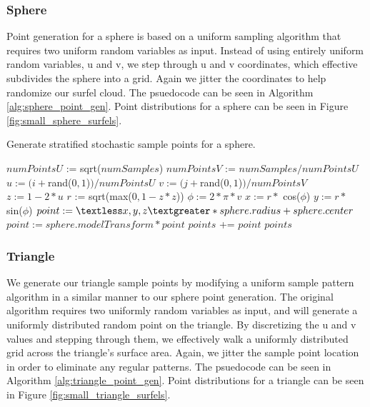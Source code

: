 \subsubsection{Sphere}
\label{sec:sphere_point_gen}
Point generation for a sphere is based on a uniform sampling algorithm \cite{bib:pbr} that requires two uniform random variables as input. Instead of using entirely uniform random variables, u and v, we step through u and v coordinates, which effective subdivides the sphere into a grid. Again we jitter the coordinates to help randomize our surfel cloud.
The psuedocode can be seen in Algorithm \ref{alg:sphere_point_gen}.
Point distributions for a sphere can be seen in Figure \ref{fig:small_sphere_surfels}.

\begin{algorithm}[H]
\captionfont
\caption[Sphere point generation]{Generate stratified stochastic sample points for a sphere.}
\label{alg:sphere_point_gen}
{\fontsize{10}{9}\selectfont
\begin{algorithmic}
      \State $numPointsU$ := sqrt($numSamples$)
      \State $numPointsV$ := $numSamples / numPointsU$
            \State $u := (i + $rand($0,1$)$) / numPointsU$
            \State $v := (j + $rand($0,1$)$) / numPointsV$
            \State $z := 1 - 2*u$
            \State $r$ := sqrt(max($0, 1- z*z$))
            \State $\phi := 2 * \pi * v$
            \State $x := r *$ cos($\phi$)
            \State $y := r *$ sin($\phi$)
            \State $point := \textless x, y, z \textgreater * sphere.radius + sphere.center$
            \State $point := sphere.modelTransform * point$
            \State $points$ += $point$
         \EndFor
      \EndFor
      \State \Return $points$
   \EndFunction
\end{algorithmic}
}
\end{algorithm}

\subsubsection{Triangle}
\label{sec:triangle_point_gen}
We generate our triangle sample points by modifying a uniform sample pattern algorithm \cite{bib:pbr} in a similar manner to our sphere point generation.
The original algorithm requires two uniformly random variables as input, and will generate a uniformly distributed random point on the triangle.
By discretizing the u and v values and stepping through them, we effectively walk a uniformly distributed grid across the triangle's surface area.
Again, we jitter the sample point location in order to eliminate any regular patterns.
The psuedocode can be seen in Algorithm \ref{alg:triangle_point_gen}.
Point distributions for a triangle can be seen in Figure \ref{fig:small_triangle_surfels}.

